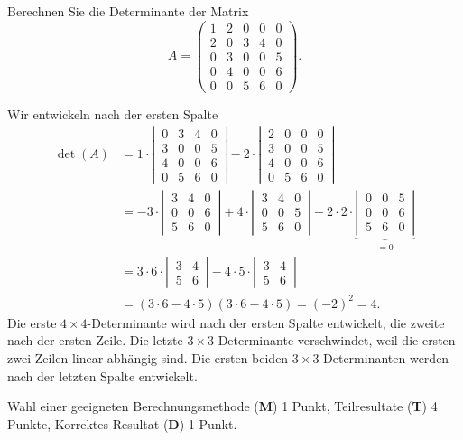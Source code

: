 Berechnen Sie die Determinante der Matrix
\[
A=\begin{pmatrix}
1&2&0&0&0\\
2&0&3&4&0\\
0&3&0&0&5\\
0&4&0&0&6\\
0&0&5&6&0
\end{pmatrix}.
\]


\begin{loesung}
Wir entwickeln nach der ersten Spalte
\begin{align*}
\det(A)
&=
1\cdot
\left|\,\begin{matrix}
0&3&4&0\\
3&0&0&5\\
4&0&0&6\\
0&5&6&0
\end{matrix}\,\right|
-2\cdot
\left|\,\begin{matrix}
2&0&0&0\\
3&0&0&5\\
4&0&0&6\\
0&5&6&0
\end{matrix}\,\right|
\\
&=
-3\cdot
\left|\,\begin{matrix}
3&4&0\\
0&0&6\\
5&6&0
\end{matrix}\,\right|
+4\cdot
\left|\,\begin{matrix}
3&4&0\\
0&0&5\\
5&6&0
\end{matrix}\,\right|
-2\cdot
2\cdot
\underbrace{
\left|\,\begin{matrix}
0&0&5\\
0&0&6\\
5&6&0
\end{matrix}\,\right|
}_{\displaystyle =0}
\\
&=
3\cdot6\cdot
\left|\,\begin{matrix}
3&4\\
5&6
\end{matrix}\,\right|
-4\cdot 5\cdot
\left|\,\begin{matrix}
3&4\\
5&6
\end{matrix}\,\right|
\\
&=(3\cdot 6-4\cdot 5)(3\cdot 6-4\cdot 5)=(-2)^2=4.
\end{align*}
Die erste $4\times 4$-Determinante wird nach der ersten Spalte entwickelt,
die zweite nach der ersten Zeile.
Die letzte $3\times 3$ Determinante verschwindet, weil die
ersten zwei Zeilen linear abhängig sind.
Die ersten beiden $3\times 3$-Determinanten werden nach der letzten Spalte entwickelt.
\qedhere
\end{loesung}


\begin{bewertung}
Wahl einer geeigneten Berechnungsmethode ({\bf M}) 1 Punkt,
Teilresultate ({\bf T}) 4 Punkte,
Korrektes Resultat ({\bf D}) 1 Punkt.
\end{bewertung}
